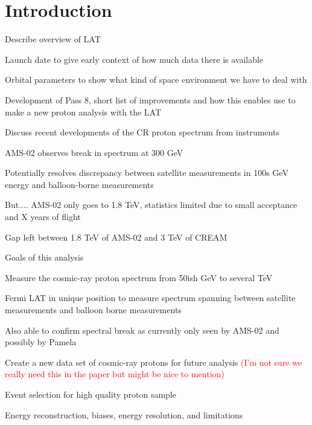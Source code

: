 \documentclass{article}
\begin{document}
\section{Introduction}
	\begin{myEnumerate}
		\item Describe overview of LAT
		\begin{myEnumerate}
			\item Launch date to give early context of how much data there is available
			\item Orbital parameters to show what kind of space environment we have to deal with
			\item Development of Pass 8, short list of improvements and how this enables use to make a new proton analysis with the LAT
		\end{myEnumerate}
		\item Discuss recent developments of the CR proton spectrum from instruments
		\begin{myEnumerate}
			\item AMS-02 observes break in spectrum at 300 GeV
			\item Potentially resolves discrepancy between satellite measurements in 100s GeV energy and balloon-borne measurements 
			\item But.... AMS-02 only goes to 1.8 TeV, statistics limited due to small acceptance and X years of flight
			\item Gap left between 1.8 TeV of AMS-02 and 3 TeV of CREAM
		\end{myEnumerate}
		\item Goals of this analysis
		\begin{myEnumerate}
			\item Measure the cosmic-ray proton spectrum from 50ish GeV to several TeV
			\item Fermi LAT in unique position to measure spectrum spanning between satellite measurements and balloon borne measurements
			\item Also able to confirm spectral break as currently only seen by AMS-02 and possibly by Pamela
			\item Create a new data set of cosmic-ray protons for future analysis \textcolor{red}{(I'm not sure we really need this in the paper but might be nice to mention)}
		\end{myEnumerate}
		\item Event selection for high quality proton sample
		\item Energy reconstruction, biases, energy resolution, and limitations

\end{myEnumerate}
\end{document}
